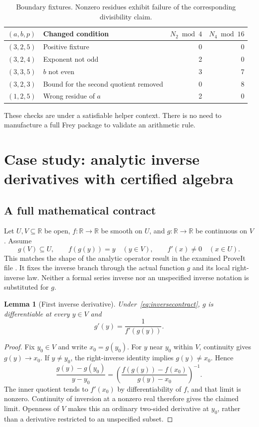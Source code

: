 \documentclass[11pt,a4paper]{article}
\newcommand{\R}{\mathbb R}\newcommand{\Q}{\mathbb Q}\newcommand{\Z}{\mathbb Z}\newcommand{\N}{\mathbb N}
\newtheorem{lemma}[theorem]{Lemma}
\theoremstyle{definition}\newtheorem{definition}[theorem]{Definition}
\theoremstyle{remark}\newtheorem{remark}[theorem]{Remark}
\begin{document}
\begin{table}[htbp]\small
\caption{Boundary fixtures. Nonzero residues exhibit failure of the corresponding divisibility claim.}
\begin{tabularx}{\textwidth}{@{}L{26mm}Yrr@{}}\toprule
$(a,b,p)$ & Changed condition & $N_2\bmod4$ & $N_4\bmod16$\\\midrule
$(3,2,5)$ & Positive fixture & 0 & 0\\
$(3,2,4)$ & Exponent not odd & 2 & 0\\
$(3,3,5)$ & $b$ not even & 3 & 7\\
$(3,2,3)$ & Bound for the second quotient removed & 0 & 8\\
$(1,2,5)$ & Wrong residue of $a$ & 2 & 0\\\bottomrule
\end{tabularx}
\end{table}
These checks are under a satisfiable helper context. There is no need to manufacture a full Frey package to validate an arithmetic rule.

\section{Case study: analytic inverse derivatives with certified algebra}
\label{sec:inverse}
\subsection{A full mathematical contract}
Let $U,V\subseteq\R$ be open, $f:\R\to\R$ be smooth on $U$, and $g:\R\to\R$ be continuous on $V$. Assume
\begin{equation}\label{eq:inversecontract}
 g(V)\subseteq U,\qquad f(g(y))=y\quad(y\in V),\qquad
 f'(x)\ne0\quad(x\in U).
\end{equation}
This matches the shape of the analytic operator result in the examined ProveIt file \cite{inverse}. It fixes the inverse branch through the actual function $g$ and its local right-inverse law. Neither a formal series inverse nor an unspecified inverse notation is substituted for $g$.

\begin{lemma}[First inverse derivative]
Under~\eqref{eq:inversecontract}, $g$ is differentiable at every $y\in V$ and
\[
 g'(y)=\frac1{f'(g(y))}.
\]
\end{lemma}
\begin{proof}
Fix $y_0\in V$ and write $x_0=g(y_0)$. For $y$ near $y_0$ within $V$, continuity gives $g(y)\to x_0$. If $y\ne y_0$, the right-inverse identity implies $g(y)\ne x_0$. Hence
\[
 \frac{g(y)-g(y_0)}{y-y_0}
 =\left(\frac{f(g(y))-f(x_0)}{g(y)-x_0}\right)^{-1}.
\]
The inner quotient tends to $f'(x_0)$ by differentiability of $f$, and that limit is nonzero. Continuity of inversion at a nonzero real therefore gives the claimed limit. Openness of $V$ makes this an ordinary two-sided derivative at $y_0$, rather than a derivative restricted to an unspecified subset.
\end{proof}
\end{document}
